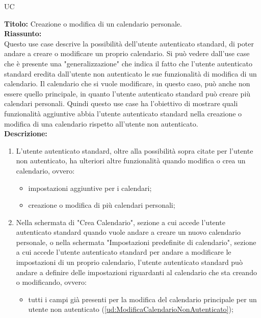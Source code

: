 \begin{listaPersonale}{UC}
\begin{listaPersonale2}[UC] {}
            \newpage
            \textbf{Titolo: } Creazione o modifica di un calendario personale. \\
            \textbf{Riassunto: } \\  Questo use case descrive la possibilità dell'utente autenticato standard, di poter andare a creare o modificare un proprio calendario. Si può vedere dall'use case che è presente una "generalizzazione" che indica il fatto che l'utente autenticato standard eredita dall'utente non autenticato le sue funzionalità di modifica di un calendario. Il calendario che si vuole modificare, in questo caso, può anche non essere quello principale, in quanto l'utente autenticato standard può creare più calendari personali. Quindi questo use case ha l'obiettivo di mostrare quali funzionalità aggiuntive abbia l'utente autenticato standard nella creazione o modifica di una calendario rispetto all'utente non autenticato. \\
            \textbf{Descrizione: }
            \begin{enumerate}
                \item L'utente autenticato standard, oltre alla possibilità sopra citate per l'utente non autenticato, ha ulteriori altre funzionalità quando modifica o crea un calendario, ovvero:
                      \begin{itemize}
                          \item impostazioni aggiuntive per i calendari;
                          \item creazione o modifica di più calendari personali;
                      \end{itemize}
                \item Nella schermata di "Crea Calendario", sezione a cui accede l'utente autenticato standard quando vuole andare a creare un nuovo calendario personale, o nella schermata "Impostazioni predefinite di calendario", sezione a cui accede l'utente autenticato standard per andare a modificare le impostazioni di un proprio calendario, l'utente autenticato standard può andare a definire delle impostazioni riguardanti al calendario che sta creando o modificando, ovvero:
                      \begin{itemize}
                          \item tutti i campi già presenti per la modifica del calendario principale per un utente non autenticato (\ref{ud:ModificaCalendarioNonAutenticato});

\end{itemize}
\end{enumerate}
\end{listaPersonale2}
\end{listaPersonale}
